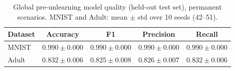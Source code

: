 \begin{table}[H]
\centering
\caption{Global pre-unlearning model quality (held-out test set), permanent scenarios. MNIST and Adult: mean $\pm$ std over 10 seeds (42--51).}
\label{tab:baseline}
\small
\begin{tabular}{@{} l c c c c @{}}
\toprule
\textbf{Dataset} & \textbf{Accuracy} & \textbf{F1} & \textbf{Precision} & \textbf{Recall} \\
\midrule
MNIST & $0.990 \pm 0.000$ & $0.990 \pm 0.000$ & $0.990 \pm 0.000$ & $0.990 \pm 0.000$ \\
Adult & $0.832 \pm 0.006$ & $0.825 \pm 0.008$ & $0.826 \pm 0.007$ & $0.832 \pm 0.006$ \\
\bottomrule
\end{tabular}
\end{table}
